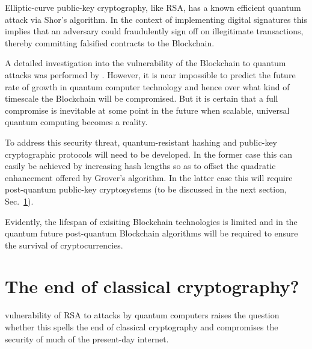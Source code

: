 Elliptic-curve public-key cryptography, like RSA, has a known efficient quantum attack via Shor's algorithm. In the context of implementing digital signatures this implies that an adversary could fraudulently sign off on illegitimate transactions, thereby committing falsified contracts to the Blockchain.

A detailed investigation into the vulnerability of the Blockchain to quantum attacks was performed by \cite{bib:TomamichelBlockchain}. However, it is near impossible to predict the future rate of growth in quantum computer technology and hence over what kind of timescale the Blockchain will be compromised. But it is certain that a full compromise is inevitable at some point in the future when scalable, universal quantum computing becomes a reality.

To address this security threat, quantum-resistant hashing and public-key cryptographic protocols will need to be developed. In the former case this can easily be achieved by increasing hash lengths so as to offset the quadratic enhancement offered by Grover's algorithm. In the latter case this will require post-quantum public-key cryptosystems (to be discussed in the next section, Sec.~\ref{sec:end_of_class_crypto}).

Evidently, the lifespan of exisiting Blockchain technologies is limited and in the quantum future post-quantum Blockchain algorithms will be required to ensure the survival of cryptocurrencies.

%
%

\section{The end of classical cryptography?} \label{sec:end_of_class_crypto}

 vulnerability of RSA to attacks by quantum computers raises the question whether this spells the end of classical cryptography and compromises the security of much of the present-day internet.

